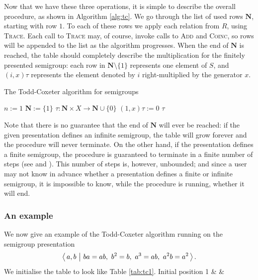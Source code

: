 Now that we have these three operations, it is simple to describe the overall
procedure, as shown in Algorithm \ref{alg:tc}.  We go through the list of used
rows $\mathbf{N}$, starting with row $1$.  To each
of these rows we apply each relation from $R$, using \textsc{Trace}.  Each call
to \textsc{Trace} may, of course, invoke calls to \textsc{Add} and
\textsc{Coinc}, so rows will be appended to the list as the algorithm
progresses.  When the end of $\mathbf{N}$ is reached, the table should
completely describe the multiplication for the finitely presented semigroup:
each row in $\mathbf{N} \setminus \{1\}$ represents one element of $S$, and
$(i, x)\tau$ represents the element denoted by $i$ right-multiplied by the
generator $x$.

\begin{algorithm}
\caption{The Todd-Coxeter algorithm for semigroups}
\label{alg:tc}
\begin{algorithmic}[1]
\State $n := 1$
\State $\mathbf{N} := \{1\}$
\State $\tau : \mathbf{N} \times X \to \mathbf{N} \cup \{0\}$
  \State $(1, x)\tau := 0$
\EndFor
{}
    \State {}
  \EndFor
\EndFor
\State \Return $\tau$
\EndProcedure
\end{algorithmic}
\end{algorithm}

Note that there is no guarantee that the end of $\mathbf{N}$ will ever be
reached: if the given presentation defines an infinite semigroup, the table will
grow forever and the procedure will never terminate.  On the other hand, if the
presentation defines a finite semigroup, the procedure is guaranteed to
terminate in a finite number of steps (see
\cite[Theorem 5.5]{cgt} and \cite[Theorem 3]{beetham_campbell_1976}).
This number of steps is, however, unbounded; and since a user may
not know in advance whether a presentation defines a finite or infinite
semigroup, it is impossible to
know, while the procedure is running, whether it will end.

\subsubsection{An example}
We now give an example of the Todd-Coxeter algorithm running on the semigroup
presentation
$$\pres{a, b}{ba=ab,\ b^2=b,\ a^3=ab,\ a^2b=a^2}.$$
We initialise the table to look like Table \ref{tab:tc1}.
{Initial position}
{ 1 & & \\ }


